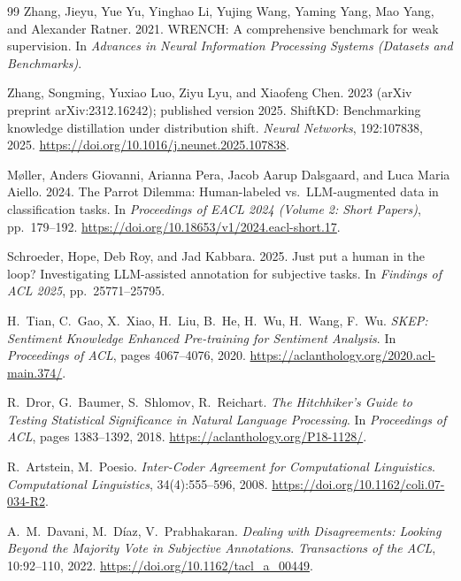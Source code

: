 \documentclass[11pt,a4paper]{article}
\begin{document}
\begin{thebibliography}{99}
Zhang, Jieyu, Yue Yu, Yinghao Li, Yujing Wang, Yaming Yang, Mao Yang,
and Alexander Ratner. 2021.
\newblock WRENCH: A comprehensive benchmark for weak supervision.
\newblock In \emph{Advances in Neural Information Processing Systems
(Datasets and Benchmarks)}.

Zhang, Songming, Yuxiao Luo, Ziyu Lyu, and Xiaofeng Chen. 2023
(arXiv preprint arXiv:2312.16242); published version 2025.
\newblock ShiftKD: Benchmarking knowledge distillation under
distribution shift.
\newblock \emph{Neural Networks}, 192:107838, 2025.
\newblock \url{https://doi.org/10.1016/j.neunet.2025.107838}.

M\o{}ller, Anders Giovanni, Arianna Pera, Jacob Aarup Dalsgaard, and
Luca Maria Aiello. 2024.
\newblock The Parrot Dilemma: Human-labeled vs.\ LLM-augmented data in
classification tasks.
\newblock In \emph{Proceedings of EACL 2024 (Volume 2: Short Papers)},
pp.~179--192.
\newblock \url{https://doi.org/10.18653/v1/2024.eacl-short.17}.

Schroeder, Hope, Deb Roy, and Jad Kabbara. 2025.
\newblock Just put a human in the loop? Investigating LLM-assisted
annotation for subjective tasks.
\newblock In \emph{Findings of ACL 2025}, pp.~25771--25795.

H.~Tian, C.~Gao, X.~Xiao, H.~Liu, B.~He, H.~Wu, H.~Wang, F.~Wu.
\newblock \emph{SKEP: Sentiment Knowledge Enhanced Pre-training for Sentiment Analysis}.
\newblock In \emph{Proceedings of ACL}, pages 4067--4076, 2020.
\newblock \url{https://aclanthology.org/2020.acl-main.374/}.

R.~Dror, G.~Baumer, S.~Shlomov, R.~Reichart.
\newblock \emph{The Hitchhiker's Guide to Testing Statistical Significance in Natural Language Processing}.
\newblock In \emph{Proceedings of ACL}, pages 1383--1392, 2018.
\newblock \url{https://aclanthology.org/P18-1128/}.

R.~Artstein, M.~Poesio.
\newblock \emph{Inter-Coder Agreement for Computational Linguistics}.
\newblock \emph{Computational Linguistics}, 34(4):555--596, 2008.
\newblock \url{https://doi.org/10.1162/coli.07-034-R2}.

A.~M.~Davani, M.~D\'iaz, V.~Prabhakaran.
\newblock \emph{Dealing with Disagreements: Looking Beyond the Majority Vote in Subjective Annotations}.
\newblock \emph{Transactions of the ACL}, 10:92--110, 2022.
\newblock \url{https://doi.org/10.1162/tacl_a_00449}.


\end{thebibliography}
\end{document}
